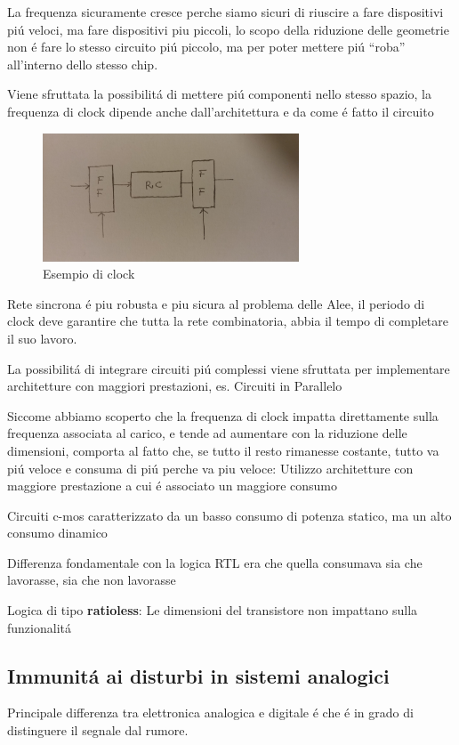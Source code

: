 \documentclass{article}
\begin{document}
La frequenza sicuramente cresce perche siamo sicuri di riuscire a fare dispositivi pi\'u veloci, ma fare dispositivi piu piccoli, lo scopo della riduzione delle geometrie non \'e fare lo stesso circuito pi\'u piccolo, ma per poter mettere pi\'u ``roba'' all'interno dello stesso chip.

Viene sfruttata la possibilit\'a di mettere pi\'u componenti nello stesso spazio, la frequenza di clock dipende anche dall'architettura e da come \'e fatto il circuito

\begin{figure}[ht]
    \centering
    \includegraphics[width=3in]{img/elettronica/esempio_clock.jpg}
    \caption{Esempio di clock}
\end{figure}

Rete sincrona \'e piu robusta e piu sicura al problema delle Alee, il periodo di clock deve garantire che tutta la rete combinatoria, abbia il tempo di completare il suo lavoro.

La possibilit\'a di integrare circuiti pi\'u complessi viene sfruttata per implementare architetture con maggiori prestazioni, es. Circuiti in Parallelo

Siccome abbiamo scoperto che la frequenza di clock impatta direttamente sulla frequenza associata al carico, e tende ad aumentare con la riduzione delle dimensioni, comporta al fatto che, se tutto il resto rimanesse costante, tutto va pi\'u veloce e consuma di pi\'u perche va piu veloce: Utilizzo architetture con maggiore prestazione a cui \'e associato un maggiore consumo

Circuiti c-mos caratterizzato da un basso consumo di potenza statico, ma un alto consumo dinamico

Differenza fondamentale con la logica RTL era che quella consumava sia che lavorasse, sia che non lavorasse

Logica di tipo \textbf{ratioless}: Le dimensioni del transistore non impattano sulla funzionalit\'a

\subsection{Immunit\'a ai disturbi in sistemi analogici}
Principale differenza tra elettronica analogica e digitale \'e  che \'e in grado di distinguere il segnale dal rumore.
\end{document}
